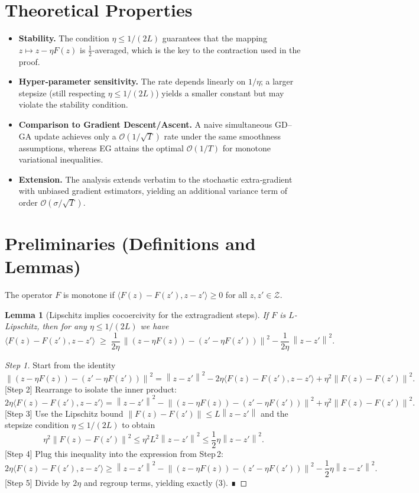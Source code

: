 \documentclass{article}
\newtheorem{lemma}{Lemma}
\newcommand{\norm}[1]{\left\lVert#1\right\rVert}
\begin{document}
\section*{Theoretical Properties}
\begin{itemize}[leftmargin=*]
\item \textbf{Stability.} The condition \(\eta\le 1/(2L)\) guarantees that the mapping
\(z\mapsto z-\eta F(z)\) is \(\frac12\)-averaged, which is the key to the contraction used in the proof.
\item \textbf{Hyper‑parameter sensitivity.} The rate depends linearly on \(1/\eta\); a larger stepsize (still respecting \(\eta\le 1/(2L)\)) yields a smaller constant but may violate the stability condition.
\item \textbf{Comparison to Gradient Descent/Ascent.} A naive simultaneous GD–GA update achieves only a \(\mathcal O(1/\sqrt{T})\) rate under the same smoothness assumptions, whereas EG attains the optimal \(\mathcal O(1/T)\) for monotone variational inequalities.
\item \textbf{Extension.} The analysis extends verbatim to the stochastic extra‑gradient with unbiased gradient estimators, yielding an additional variance term of order \(\mathcal O(\sigma/\sqrt{T})\).
\end{itemize}

\section*{Preliminaries (Definitions and Lemmas)}
\begin{definition}[Monotonicity]
The operator \(F\) is monotone if
\(\langle F(z)-F(z'),z-z'\rangle\ge 0\) for all \(z,z'\in\mathcal Z\).
\end{definition}
\begin{lemma}[Lipschitz implies cocoercivity for the extragradient steps]\label{lem:coco}
If \(F\) is \(L\)-Lipschitz, then for any \(\eta\le 1/(2L)\) we have
\[
\langle F(z)-F(z'),z-z'\rangle
\;\ge\;
\frac{1}{2\eta}\,\norm{(z-\eta F(z))-(z'-\eta F(z'))}^{2}
-\frac{1}{2\eta}\,\norm{z-z'}^{2}.
\tag{3}
\]
\end{lemma}
\begin{proof}
[Step 1] Start from the identity
\[
\norm{(z-\eta F(z))-(z'-\eta F(z'))}^{2}
= \norm{z-z'}^{2}-2\eta\langle F(z)-F(z'),z-z'\rangle+\eta^{2}\norm{F(z)-F(z')}^{2}.
\]
[Step 2] Rearrange to isolate the inner product:
\[
2\eta\langle F(z)-F(z'),z-z'\rangle
= \norm{z-z'}^{2}-\norm{(z-\eta F(z))-(z'-\eta F(z'))}^{2}+\eta^{2}\norm{F(z)-F(z')}^{2}.
\]
[Step 3] Use the Lipschitz bound \(\norm{F(z)-F(z')}\le L\norm{z-z'}\) and the stepsize condition \(\eta\le 1/(2L)\) to obtain
\[
\eta^{2}\norm{F(z)-F(z')}^{2}\le \eta^{2}L^{2}\norm{z-z'}^{2}\le \frac12\eta\norm{z-z'}^{2}.
\]
[Step 4] Plug this inequality into the expression from Step 2:
\[
2\eta\langle F(z)-F(z'),z-z'\rangle
\ge \norm{z-z'}^{2}-\norm{(z-\eta F(z))-(z'-\eta F(z'))}^{2}-\frac12\eta\norm{z-z'}^{2}.
\]
[Step 5] Divide by \(2\eta\) and regroup terms, yielding exactly (3). ∎
\end{proof}
\end{document}
